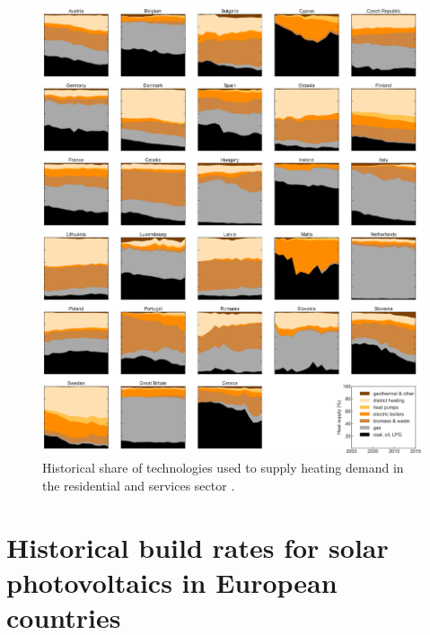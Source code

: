 \documentclass[3p]{elsarticle} %
\begin{document}
\begin{figure}[!h]
\centering
\includegraphics[width=\textwidth]{../figures/heating_historical.png}
\caption{Historical share of technologies used to supply heating demand in the residential and services sector \cite{IDEES}. } \label{fig_historical_heating} 
\end{figure}



\FloatBarrier

\clearpage

\section{Historical build rates for solar photovoltaics in European countries}
\end{document}
